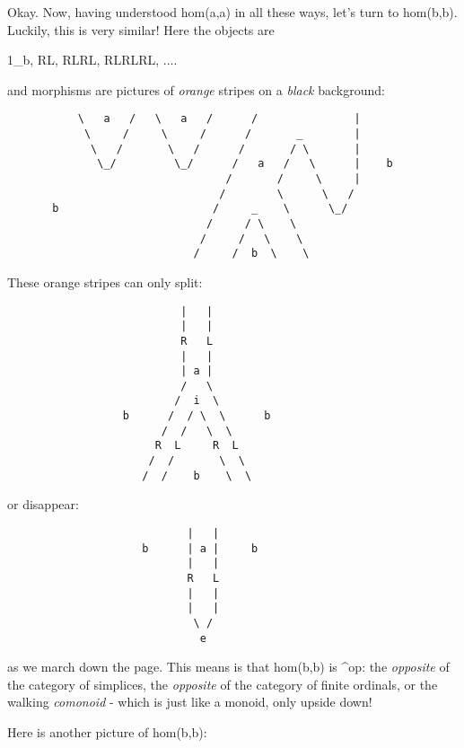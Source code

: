 Okay.  Now, having understood hom(a,a) in all these ways, let's turn
to hom(b,b).  Luckily, this is very similar!  Here the objects are

1_{b}, RL, RLRL, RLRLRL, ....

and morphisms are pictures of \emph{orange} stripes on a
\emph{black} background:

\begin{verbatim}
           \   a   /   \   a   /      /               |
            \     /     \     /      /       _        |
             \   /       \   /      /       / \       |
              \_/         \_/      /   a   /   \      |    b
                                  /       /     \     |
                                 /        \      \   / 
       b                        /     _    \      \_/ 
                               /     / \    \      
                              /     /   \    \       
                             /     /  b  \    \  
\end{verbatim}
    
These orange stripes can only split:

\begin{verbatim}
                           |   |
                           |   |   
                           R   L
                           |   |
                           | a |
                           /   \                           
                          /  i  \
                  b      /  / \  \      b
                        /  /   \  \
                       R  L     R  L
                      /  /       \  \
                     /  /    b    \  \ 
\end{verbatim}
    
or disappear:

\begin{verbatim}
                            |   |    
                     b      | a |     b 
                            |   |
                            R   L   
                            |   |
                            |   |
                             \ /
                              e
\end{verbatim}
    
as we march down the page.  This means is that hom(b,b) is
\Delta ^{op}: the \emph{opposite} of the category of simplices, the 
\emph{opposite} of the category of finite ordinals, or the walking
\emph{comonoid} - which is just like a monoid, only upside down!  

Here is another picture of hom(b,b):

